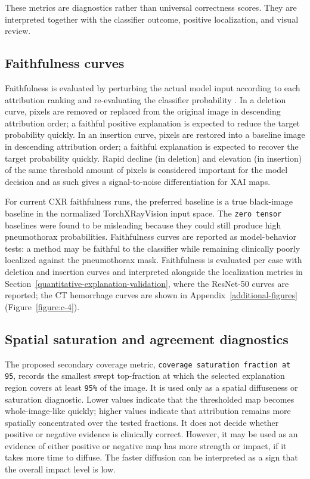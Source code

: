 These metrics are diagnostics rather than universal correctness scores.
They are interpreted together with the classifier outcome, positive
localization, and visual review.

\hypertarget{faithfulness-curves}{%
	\subsection{Faithfulness curves}\label{faithfulness-curves}}

Faithfulness is evaluated by perturbing the actual model input according
to each attribution ranking and re-evaluating the classifier probability
\cite{ref-rise, ref-samek-evaluation}. In a deletion curve, pixels are
removed or replaced from the original image in descending attribution
order; a faithful positive explanation is expected to reduce the target
probability quickly. In an insertion curve, pixels are restored into a
baseline image in descending attribution order; a faithful explanation
is expected to recover the target probability quickly. 
Rapid decline (in deletion) and elevation (in insertion) of the same threshold
amount of pixels is considered important for the model
decision and as such gives a signal-to-noise differentiation for XAI maps.

For current CXR faithfulness runs, the preferred baseline is a true
black-image baseline in the normalized TorchXRayVision input space.
The \texttt{zero \allowbreak tensor} baselines were found to be misleading
because they could still produce high pneumothorax probabilities.
Faithfulness curves are reported as model-behavior tests: a method may
be faithful to the classifier while remaining clinically poorly
localized against the pneumothorax mask. Faithfulness is evaluated per
case with deletion and insertion curves and interpreted alongside the
localization metrics in Section~\ref{quantitative-explanation-validation},
where the ResNet-50 curves are reported; the CT hemorrhage curves are
shown in Appendix~\ref{additional-figures} (Figure~\ref{figure:c-4}).

\hypertarget{spatial-saturation-and-agreement-diagnostics}{%
	\subsection{Spatial saturation and agreement
		diagnostics}\label{spatial-saturation-and-agreement-diagnostics}}

The proposed secondary coverage metric,
\texttt{coverage \allowbreak saturation \allowbreak fraction \allowbreak at 95}, records the smallest swept
top-fraction at which the selected explanation region covers at least
\texttt{95\%} of the image. It is used only as a spatial diffuseness or
saturation diagnostic. Lower values indicate that the thresholded map
becomes whole-image-like quickly; higher values indicate that
attribution remains more spatially concentrated over the tested
fractions. It does not decide whether positive or negative evidence is
clinically correct. However, it may be used as an evidence of either positive 
or negative map has more strength or impact, if it takes more time to
diffuse. The faster diffusion can be interpreted as a sign that the overall 
impact level is low.


